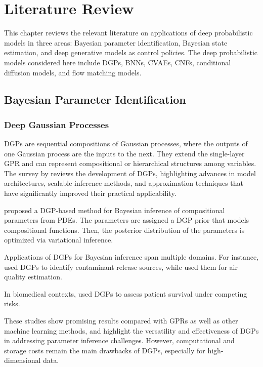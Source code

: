 \chapter{Literature Review}
\label{chap:literature}
This chapter reviews the relevant literature on applications of deep probabilistic models in three areas: Bayesian parameter identification, Bayesian state estimation, and deep generative models as control policies. The deep probabilistic models considered here include \acp{DGP}, \acp{BNN}, \acp{CVAE}, \acp{CNF}, conditional diffusion models, and flow matching models.

\section{Bayesian Parameter Identification}  
\subsection{Deep Gaussian Processes}
\acp{DGP} are sequential compositions of Gaussian processes, where the outputs of one Gaussian process are the inputs to the next. They extend the single-layer \ac{GPR} and can represent compositional or hierarchical structures among variables. The survey by \citet{jakkala2021survey} reviews the development of \acp{DGP}, highlighting advances in model architectures, scalable inference methods, and approximation techniques that have significantly improved their practical applicability.

\citeauthor{abraham2023deepgp} \citeyearpar{abraham2023deepgp} proposed a \ac{DGP}-based method for Bayesian inference of compositional parameters from \acp{PDE}. The parameters are assigned a \ac{DGP} prior that models compositional functions. Then, the posterior distribution of the parameters is optimized via variational inference.

Applications of \acp{DGP} for Bayesian inference span multiple domains. For instance, \citeauthor{dgp2018park} \citeyearpar{dgp2018park} used \acp{DGP} to identify contaminant release sources, while \citeauthor{dgp2023desai} \citeyearpar{dgp2023desai} used them for air quality estimation. 

In biomedical contexts, \citeauthor{NIPS2017_861dc9bd} \citeyearpar{NIPS2017_861dc9bd} used \acp{DGP} to assess patient survival under competing risks. 

These studies show promising results compared with \acp{GPR} as well as other machine learning methods, and highlight the versatility and effectiveness of \acp{DGP} in addressing parameter inference challenges. However, computational and storage costs remain the main drawbacks of \acp{DGP}, especially for high-dimensional data.

